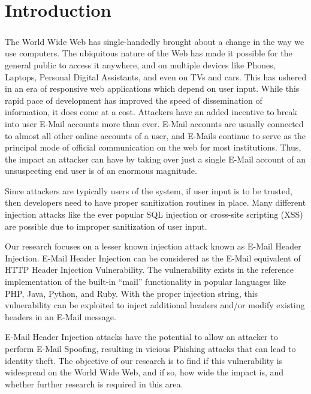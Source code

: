 \chapter{Introduction}
\paragraph{}
	The World Wide Web has single-handedly brought about a change in the way we use computers. The ubiquitous nature of the Web has made it possible for the general public to access it anywhere, and on multiple devices like Phones, Laptops, Personal Digital Assistants, and even on TVs and cars. This has ushered in an era of responsive web applications which depend on user input. While this rapid pace of development has improved the speed of dissemination of information, it does come at a cost. Attackers have an added incentive to break into user E-Mail accounts more than ever. E-Mail accounts are usually connected to almost all other online accounts of a user, and E-Mails continue to serve as the principal mode of official communication on the web for most institutions. Thus, the impact an attacker can have by taking over just a single E-Mail account of an unsuspecting end user is of an enormous magnitude. 
	
	Since attackers are typically users of the system, if user input is to be trusted, then developers need to have proper sanitization routines in place. Many different injection attacks like the ever popular SQL injection or cross-site scripting (XSS) \cite{OWASPT10} are possible due to improper sanitization of user input. 
	
	Our research focuses on a lesser known injection attack known as E-Mail Header Injection. E-Mail Header Injection can be considered as the E-Mail equivalent of HTTP Header Injection Vulnerability. The vulnerability exists in the reference implementation of the built-in “mail” functionality in popular languages like PHP, Java, Python, and Ruby. With the proper injection string, this vulnerability can be exploited to inject additional headers and/or modify existing headers in an E-Mail message.
	
	E-Mail Header Injection attacks have the potential to allow an attacker to perform E-Mail Spoofing, resulting in vicious Phishing attacks that can lead to identity theft.
	The objective of our research is to find if this vulnerability is widespread on the World Wide Web, and if so, how wide the impact is, and whether further research is required in this area.
	
